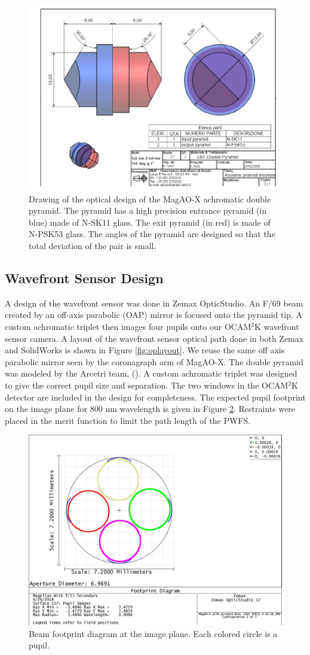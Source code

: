 \begin{figure}
    \centering
    \includegraphics[width=.6\textwidth]{Chapter Materials/Chapter Three Materials/pyramidprismfull.JPG}
    \caption{Drawing of the optical design of the MagAO-X achromatic double pyramid. The pyramid has a high precision entrance pyramid (in blue) made of N-SK11 glass. The exit pyramid (in red) is made of N-PSK53 glass. The angles of the pyramid are designed so that the total deviation of the pair is small.}
    \label{fig:fullpyramidprism}
\end{figure}
	
	
	
\subsection{Wavefront Sensor Design}
	
A design of the wavefront sensor was done in Zemax OpticStudio. An F/69 beam created by an off-axis parabolic (OAP) mirror is focused onto the pyramid tip. A custom achromatic triplet then images four pupils onto our OCAM$^2$K wavefront sensor camera. A layout of the wavefront sensor optical path done in both Zemax and SolidWorks is shown in Figure \ref{fig:oplayout}. We reuse the same off axis parabolic mirror seen by the coronagraph arm of MagAO-X. The double pyramid was modeled by the Arcetri team, (\cite{tozzi2008double}). A custom achromatic triplet was designed to give the correct pupil size and separation. The two windows in the OCAM$^2$K detector are included in the design for completeness. The expected pupil footprint on the image plane for 800 nm wavelength is given in Figure \ref{fig:footprint}. Restraints were placed in the merit function to limit the path length of the PWFS. 

\begin{figure}[h]
	\centering
	\includegraphics[width=.5\textwidth]{Chapter Materials/Chapter Three Materials/Pupils6-20-18.jpg}
	\caption{Beam footprint diagram at the image plane. Each colored circle is a pupil.}
	\label{fig:footprint}
\end{figure}

